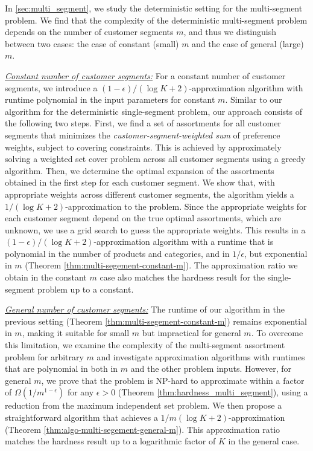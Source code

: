 \documentclass[msom,non-blindrev]{informs3} %
\theoremstyle{definition}
\begin{document}
In \cref{sec:multi_segment}, we study the deterministic setting for the multi-segment problem. We find that the complexity of the deterministic multi-segment problem depends on the number of customer segments $m$, and thus we distinguish between two cases: the case of constant (small) $m$ and the case of general (large) $m$.





\noindent\underline{\textit{Constant number of customer segments:}} 
For a constant number of customer segments, we introduce a $(1-\epsilon)/(\log K+2)$-approximation algorithm with runtime polynomial in the input parameters for constant $m$. Similar to our algorithm for the deterministic single-segment problem, our approach consists of the following two steps. First, we find a set of assortments for all customer segments that minimizes the {\em customer-segment-weighted sum} of preference weights, subject to covering constraints. This is achieved by approximately solving a weighted set cover problem across all customer segments using a greedy algorithm. Then, we determine the optimal expansion of the assortments obtained in the first step for each customer segment. We show that, with appropriate weights across different customer segments, the algorithm yields a $1/(\log K+2)$-approximation to the problem. 
Since the appropriate weights for each customer segment depend on the true optimal assortments, which are unknown, we use a grid search to guess the appropriate weights. This results in a $(1-\epsilon)/(\log K+2)$-approximation algorithm with a runtime that is polynomial in the number of products and categories, and in $1/\epsilon$, but exponential in $m$ (Theorem \ref{thm:multi-segement-constant-m}). The approximation ratio we obtain in the constant $m$ case also matches the hardness result for the single-segment problem up to a constant.


\noindent\underline{\textit{General number of customer segments:}} 
The runtime of our algorithm in the previous setting (Theorem \ref{thm:multi-segement-constant-m}) remains exponential in $m$, making it suitable for small $m$ but impractical for general $m$. To overcome this limitation, we examine the complexity of the multi-segment assortment problem for arbitrary $m$ and investigate approximation algorithms with runtimes that are polynomial in both in $m$ and the other problem inputs. However, for general $m$, we prove that the problem is NP-hard to approximate within a factor of $\Omega(1/m^{1-\epsilon})$ for any $\epsilon > 0$ (Theorem \ref{thm:hardness_multi_segment}), using a reduction from the maximum independent set problem. We then propose a straightforward algorithm that achieves a $1/m(\log K + 2)$-approximation (Theorem \ref{thm:algo-multi-segement-general-m}). This approximation ratio matches the hardness result up to a logarithmic factor of $K$ in the general case.
\end{document}
